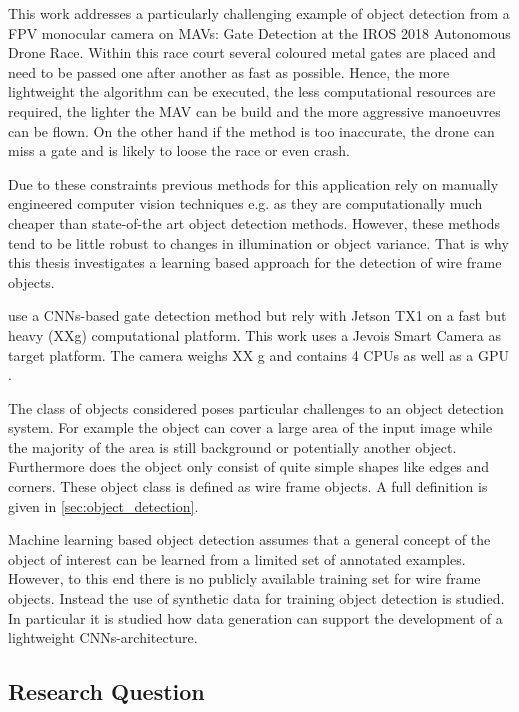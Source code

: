 This work addresses a particularly challenging example of object detection from a FPV monocular camera on \acp{MAV}: Gate Detection at the IROS 2018 Autonomous Drone Race. Within this race court several coloured metal gates are placed and need to be passed one after another as fast as possible. Hence, the more lightweight the algorithm can be executed, the less computational resources are required, the lighter the \ac{MAV} can be build and the more aggressive manoeuvres can be flown. On the other hand if the method is too inaccurate, the drone can miss a gate and is likely to loose the race or even crash.

Due to these constraints previous methods for this application rely on manually engineered computer vision techniques e.g. as they are computationally much cheaper than state-of-the art object detection methods. However, these methods tend to be little robust to changes in illumination or object variance. That is why this thesis investigates a learning based approach for the detection of wire frame objects.

 use a \acp{CNN}-based gate detection method but rely with Jetson TX1 on a fast but heavy (XXg) computational platform. This work uses a Jevois Smart Camera  as target platform. The camera weighs XX g and contains 4 CPUs as well as a GPU .

The class of objects considered poses particular challenges to an object detection system. For example the object can cover a large area of the input image while the majority of the area is still background or potentially another object. Furthermore does the object only consist of quite simple shapes like edges and corners. These object class is defined as wire frame objects. A full definition is given in \autoref{sec:object_detection}.

Machine learning based object detection assumes that a general concept of the object of interest can be learned from a limited set of annotated examples. However,  to this end there is no publicly available training set for wire frame objects. Instead the use of synthetic data for training object detection is studied. In particular it is studied how data generation can support the development of a lightweight \acp{CNN}-architecture.

\subsection*{Research Question}

